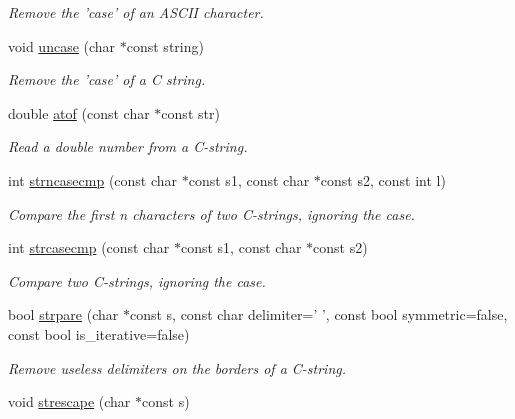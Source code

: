 \begin{DoxyCompactItemize}
\begin{DoxyCompactList}\small\item\em Remove the 'case' of an ASCII character. \item\end{DoxyCompactList}\item 
void \hyperlink{namespacecimg__library_1_1cimg_aeec70054768b152c0dbea51f5a56536b}{uncase} (char $\ast$const string)
\begin{DoxyCompactList}\small\item\em Remove the 'case' of a C string. \item\end{DoxyCompactList}\item 
double \hyperlink{namespacecimg__library_1_1cimg_ac5a608a78a32b5c95a2dfad8657300de}{atof} (const char $\ast$const str)
\begin{DoxyCompactList}\small\item\em Read a double number from a C-\/string. \item\end{DoxyCompactList}\item 
int \hyperlink{namespacecimg__library_1_1cimg_a747de40c911c42d60e1a4ee3f0c69c6c}{strncasecmp} (const char $\ast$const s1, const char $\ast$const s2, const int l)
\begin{DoxyCompactList}\small\item\em Compare the first {\ttfamily n} characters of two C-\/strings, ignoring the case. \item\end{DoxyCompactList}\item 
int \hyperlink{namespacecimg__library_1_1cimg_a43334b3df38ff7c4369a503a4fc3a9f9}{strcasecmp} (const char $\ast$const s1, const char $\ast$const s2)
\begin{DoxyCompactList}\small\item\em Compare two C-\/strings, ignoring the case. \item\end{DoxyCompactList}\item 
\hypertarget{namespacecimg__library_1_1cimg_ae5fb9cb1d07a01027ba5b029c119bce5}{
bool \hyperlink{namespacecimg__library_1_1cimg_ae5fb9cb1d07a01027ba5b029c119bce5}{strpare} (char $\ast$const s, const char delimiter=' ', const bool symmetric=false, const bool is\_\-iterative=false)}
\label{namespacecimg__library_1_1cimg_ae5fb9cb1d07a01027ba5b029c119bce5}

\begin{DoxyCompactList}\small\item\em Remove useless delimiters on the borders of a C-\/string. \item\end{DoxyCompactList}\item 
\hypertarget{namespacecimg__library_1_1cimg_a7710ef1683aa12ead974583b764cd353}{
void \hyperlink{namespacecimg__library_1_1cimg_a7710ef1683aa12ead974583b764cd353}{strescape} (char $\ast$const s)}
\label{namespacecimg__library_1_1cimg_a7710ef1683aa12ead974583b764cd353}


\end{DoxyCompactItemize}
